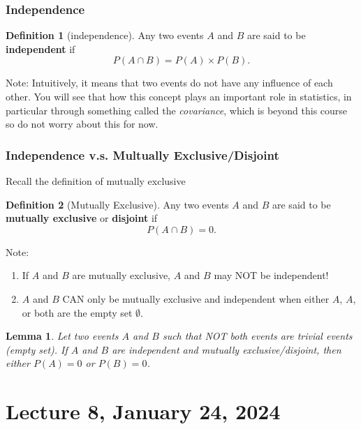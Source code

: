 \documentclass[
]{book}
\newtheorem{lemma}{Lemma}[chapter]
\theoremstyle{definition}
\newtheorem{definition}{Definition}[chapter]
\theoremstyle{definition}
\theoremstyle{definition}
\theoremstyle{definition}
\theoremstyle{remark}
\begin{document}
\hypertarget{independence}{%
\subsection{Independence}\label{independence}}

\begin{definition}[independence]
Any two events \(A\) and \(B\) are said to be \textbf{independent} if
\[
  P(A \cap B) = P(A)\times P(B).
\]
\end{definition}

Note: Intuitively, it means that two events do not have any influence of each other. You will see that how this concept plays an important role in statistics, in particular through something called the \emph{covariance}, which is beyond this course so do not worry about this for now.

\hypertarget{independence-v.s.-multually-exclusivedisjoint}{%
\subsection{Independence v.s. Multually Exclusive/Disjoint}\label{independence-v.s.-multually-exclusivedisjoint}}

Recall the definition of mutually exclusive

\begin{definition}[Mutually Exclusive]
Any two events \(A\) and \(B\) are said to be \textbf{mutually exclusive} or \textbf{disjoint} if
\[
  P(A \cap B) = 0.
\]
\end{definition}

Note:

\begin{enumerate}
\def\labelenumi{\arabic{enumi}.}
\item
  If \(A\) and \(B\) are mutually exclusive, \(A\) and \(B\) may NOT be independent!
\item
  \(A\) and \(B\) CAN only be mutually exclusive and independent when either \(A\), \(A\), or both are the empty set \(\emptyset\).
\end{enumerate}

\begin{lemma}
Let two events \(A\) and \(B\) such that NOT both events are trivial events (empty set). If \(A\) and \(B\) are independent and mutually exclusive/disjoint, then either \(P(A) = 0\) or \(P(B) = 0\).
\end{lemma}

\hypertarget{lecture-8-january-24-2024}{%
\chapter{Lecture 8, January 24, 2024}\label{lecture-8-january-24-2024}}
\end{document}
